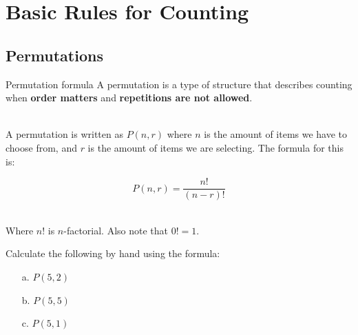
\newcommand{\laClass}       {CS 211}
\newcommand{\laSemester}    {Spring 2018}
\newcommand{\laChapter}     {5.2}
\newcommand{\laType}        {Exercise}
\newcommand{\laPoints}      {5}
\newcommand{\laTitle}       {Basic Rules for Counting}
\newcommand{\laDate}        {Jan 18, 2018}
\setcounter{chapter}{5}
\setcounter{section}{2}
\addtocounter{section}{-1}

\toggletrue{answerkey}
\togglefalse{answerkey}






    \section{\laTitle}


    \subsection{Permutations}

    \begin{intro}{Permutation formula}
        A permutation is a type of structure that describes counting when
        \textbf{order matters} and \textbf{repetitions are not allowed}.

        ~\\  A permutation is written as $P(n, r)$ where $n$ is the amount of
        items we have to choose from, and $r$ is the amount of items we
        are selecting. The formula for this is:

        $$ P(n, r) = \frac{n!}{(n-r)!} $$

        ~\\ Where $n!$ is $n$-factorial. Also note that $0! = 1$.
    \end{intro}
    

    \begin{questionNOGRADE}{\thequestion}
        Calculate the following by hand using the formula:

        \begin{enumerate}
            \item[a.]   $P(5, 2)$
            \item[b.]   $P(5, 5)$
            \item[c.]   $P(5, 1)$
        \end{enumerate}
    \end{questionNOGRADE}

